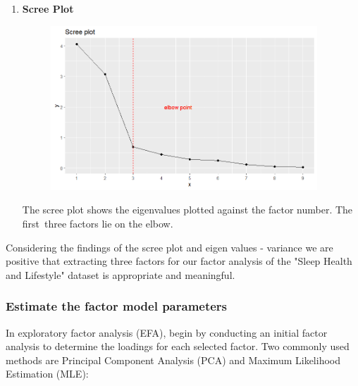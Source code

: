 \documentclass[11pt]{article}
\begin{document}
\begin{enumerate}
				\item \textbf{Scree Plot}
				\begin{figure}[h]
					\centering
					\includegraphics[width=10cm]{Images/scree_plot}
					\label{fig:screeplot}
				\end{figure}
				
				The scree plot shows the eigenvalues plotted against the factor number. The first three factors lie on the elbow. 
			\end{enumerate}
			
			Considering the findings of the scree plot and eigen values - variance we are positive that extracting three factors for our factor analysis of the "Sleep Health and Lifestyle" dataset is appropriate and meaningful.
			
			\subsubsection{Estimate the factor model parameters}
			In exploratory factor analysis (EFA), begin by conducting an initial factor analysis to determine the loadings for each selected factor. Two commonly used methods are Principal Component Analysis (PCA) and Maximum Likelihood Estimation (MLE):
			
\end{document}

